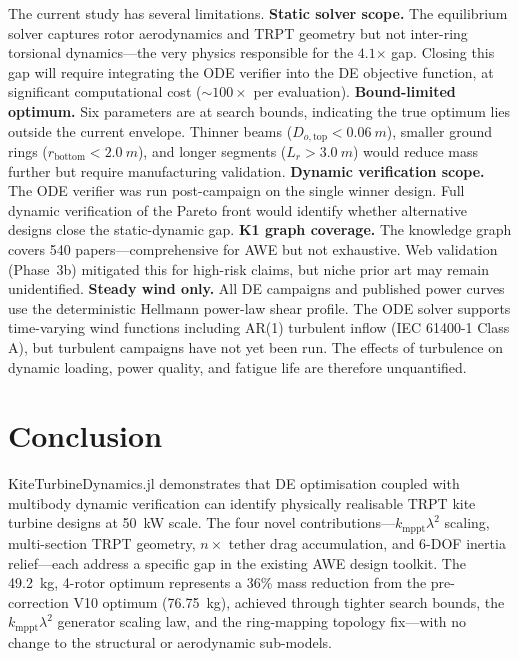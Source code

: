 \documentclass[11pt,a4paper]{article}
\begin{document}
The current study has several limitations. \textbf{Static solver scope.} The equilibrium solver captures rotor aerodynamics and TRPT geometry but not inter-ring torsional dynamics—the very physics responsible for the $4.1$$\times$ gap. Closing this gap will require integrating the ODE verifier into the DE objective function, at significant computational cost ($\sim 100\times$ per evaluation). \textbf{Bound-limited optimum.} Six parameters are at search bounds, indicating the true optimum lies outside the current envelope. Thinner beams ($D_{o,\mathrm{top}} < 0.06~m$), smaller ground rings ($r_{\mathrm{bottom}} < 2.0~m$), and longer segments ($L_r > 3.0~m$) would reduce mass further but require manufacturing validation. \textbf{Dynamic verification scope.} The ODE verifier was run post-campaign on the single winner design. Full dynamic verification of the Pareto front would identify whether alternative designs close the static-dynamic gap. \textbf{K1 graph coverage.} The knowledge graph covers 540 papers—comprehensive for AWE but not exhaustive. Web validation (Phase~3b) mitigated this for high-risk claims, but niche prior art may remain unidentified. \textbf{Steady wind only.} All DE campaigns and published power curves use the deterministic Hellmann power-law shear profile. The ODE solver supports time-varying wind functions including AR(1) turbulent inflow (IEC 61400-1 Class A), but turbulent campaigns have not yet been run. The effects of turbulence on dynamic loading, power quality, and fatigue life are therefore unquantified.

\section{Conclusion}

KiteTurbineDynamics.jl demonstrates that DE optimisation coupled with multibody dynamic verification can identify physically realisable TRPT kite turbine designs at 50~kW scale. The four novel contributions—$k_{\mathrm{mppt}} \lambda^2$ scaling, multi-section TRPT geometry, $n\times$ tether drag accumulation, and 6-DOF inertia relief—each address a specific gap in the existing AWE design toolkit. The 49.2~kg, 4-rotor optimum represents a 36\% mass reduction from the pre-correction V10 optimum (76.75~kg), achieved through tighter search bounds, the $k_{\mathrm{mppt}} \lambda^2$ generator scaling law, and the ring-mapping topology fix—with no change to the structural or aerodynamic sub-models.
\end{document}

